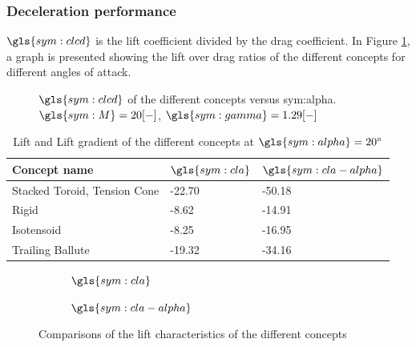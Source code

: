 \subsubsection{Deceleration performance}
$\gls{sym:clcd}$ is the lift coefficient divided by the drag coefficient. In Figure \ref{fig:clcd}, a graph is presented showing the lift over drag ratios of the different concepts for different angles of attack.

\begin{figure}[b]
	\setlength{} 
	\setlength{}
	
	\caption{$\gls{sym:clcd}$ of the different concepts versus \gls{sym:alpha}. $\gls{sym:M}=20[-]$, $\gls{sym:gamma}=1.29[-]$}
	\label{fig:clcd}
\end{figure}

\begin{table}[H]
	\caption{Lift and Lift gradient of the different concepts at $\gls{sym:alpha}=20^\circ$}%
	\label{tab:lift}%
	\begin{tabular}{|p{}|p{}|p{}|}
		\hline
		Concept name  					& $\gls{sym:cla}$	& $\gls{sym:cla-alpha}$	\\ \hline \hline
		Stacked Toroid, Tension Cone	& -22.70     		& -50.18				\\ \hline
		Rigid  							& -8.62				& -14.91				\\ \hline
		Isotensoid  					& -8.25				& -16.95				\\ \hline
		Trailing Ballute				& -19.32			& -34.16				\\ \hline				
	\end{tabular}
\end{table}

\begin{figure}[h]
	\centering
	\begin{subfigure}[b]{0.49\textwidth}
		\setlength{} 
		\setlength{}
		
		\caption{$\gls{sym:cla}$}
		\label{fig:cl}
	\end{subfigure}
	\begin{subfigure}[b]{0.49\textwidth}
		\setlength{} 
		\setlength{}
		
		\caption{$\gls{sym:cla-alpha}$}
		\label{fig:claplha}
	\end{subfigure}
	\caption{Comparisons of the lift characteristics of the different concepts}
	\label{fig:clplots}
\end{figure}

